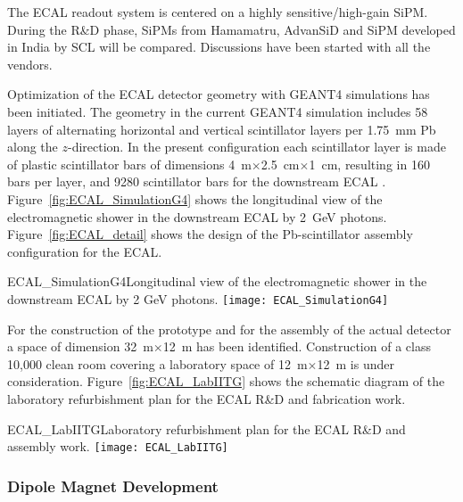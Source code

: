 The ECAL readout system is centered on a highly sensitive/high-gain
SiPM.  During the R\&D phase, SiPMs from Hamamatru, AdvanSiD and SiPM
developed in India by SCL will be compared.  Discussions have been
started with all the vendors.


Optimization of the ECAL detector geometry with GEANT4 simulations has
been initiated. The geometry in the current GEANT4 simulation includes
58 layers of alternating horizontal and vertical scintillator layers
per 1.75~mm Pb along the $z$-direction. In the present configuration
each scintillator layer is made of plastic scintillator bars of
dimensions 4~m$\times$2.5~cm$\times$1~cm, resulting in 160 bars per
layer, and \num{9280} scintillator bars for the downstream ECAL .
Figure~\ref{fig:ECAL_SimulationG4} shows the longitudinal view of the
electromagnetic shower in the downstream ECAL by 2~GeV
photons. Figure~\ref{fig:ECAL_detail} shows the design of the
Pb-scintillator assembly configuration for the ECAL.
\begin{cdrfigure}
{ECAL_SimulationG4}{Longitudinal view of the electromagnetic shower in
the downstream ECAL by 2 GeV photons.}
\texttt{[image: ECAL\_SimulationG4]}
\end{cdrfigure}

For the construction of the prototype and for the assembly of the
actual detector a space of dimension 32~m$\times$12~m has been
identified. Construction of a class 10,000 clean room covering a
laboratory space of 12~m$\times$12~m is under consideration.
Figure~\ref{fig:ECAL_LabIITG} shows the schematic diagram of the
laboratory refurbishment plan for the ECAL R\&D and fabrication work.
\begin{cdrfigure}
{ECAL_LabIITG}{Laboratory refurbishment plan for the ECAL R\&D and assembly work.}
\texttt{[image: ECAL\_LabIITG]}
\end{cdrfigure}


\subsubsection{Dipole Magnet Development}

